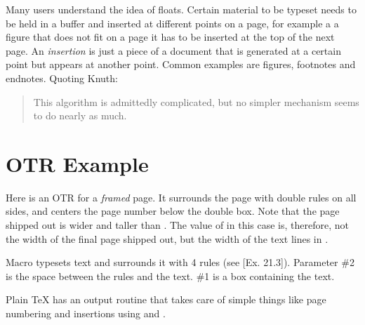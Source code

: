 Many users understand the idea of floats. Certain material to be typeset needs to be held in a buffer and inserted at different points on a page, for example a a figure that does not fit on a page it has to be inserted at the top of the next page. An \textit{insertion} is just a piece of a document that is generated at a certain point but appears at another point. Common examples are figures, footnotes and endnotes. Quoting Knuth:

\begin{quote}
  This  algorithm  is  admittedly  complicated, 
but  no  simpler  mechanism  seems  to  do  nearly 
as  much.
\end{quote}

\section{OTR Example}

\begin{comment}
\begin{figure}%
 \centering
  \texttt{[image: ./graphics/framedpage.jpg]}
  \caption{A boxed page}
  \label{fig:framedpage}
\end{figure}
\end{comment}

Here is an OTR for a \textit{framed} page. It surrounds the
page with double rules on all sides, and centers the
page number below the double box. Note that the
page shipped out is wider and taller than .
The value of  in this case is, therefore, not
the width of the final page shipped out, but the
width of the text lines in .

Macro  typesets text and surrounds it
with 4 rules (see [Ex. 21.3]). Parameter \#2 is the
space between the rules and the text. \#1 is a box
containing the text.



Plain TeX has an output routine that takes care of  simple things like page numbering and insertions
using  and . 

